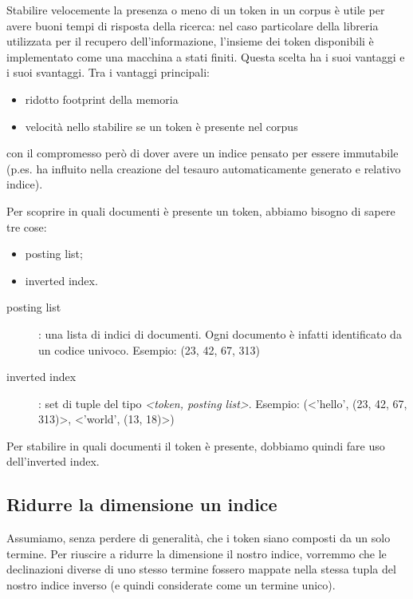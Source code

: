 Stabilire velocemente la presenza o meno di un \gls{token} in un \gls{corpus} è utile per avere buoni tempi di risposta della ricerca: nel caso particolare della libreria utilizzata per il recupero dell'informazione, l'insieme dei \gls{token} disponibili è implementato come una macchina a stati finiti. Questa scelta ha i suoi vantaggi e i suoi svantaggi.
Tra i vantaggi principali:
\begin{itemize}
    \item ridotto footprint della memoria
    \item velocità nello stabilire se un \gls{token} è presente nel \gls{corpus} 
\end{itemize}
con il compromesso però di dover avere un indice pensato per essere immutabile (p.es. ha influito nella creazione del tesauro automaticamente generato e relativo indice).

Per scoprire in quali documenti è presente un \gls{token}, abbiamo bisogno di sapere tre cose:
\begin{itemize}
\item posting list;
\item inverted index.
\end{itemize}

\begin{description}
    \item[posting list]: una lista di indici di documenti. Ogni documento è infatti identificato da un codice univoco. \newline{}
    Esempio: (23, 42, 67, 313)
    \item[inverted index]: set di tuple del tipo \textit{<\gls{token}, posting list>}. \newline{}
    Esempio: (<'hello', (23, 42, 67, 313)>, <'world', (13, 18)>)
\end{description}

Per stabilire in quali documenti il \gls{token} è presente, dobbiamo quindi fare uso dell'inverted index.


\subsection{Ridurre la dimensione un indice}
\label{sub:stemvslemma}
Assumiamo, senza perdere di generalità, che i \gls{token} siano composti da un solo termine.
Per riuscire a ridurre la dimensione il nostro indice, vorremmo che le declinazioni diverse di uno stesso termine fossero mappate nella stessa tupla del nostro indice inverso (e quindi considerate come un termine unico).

